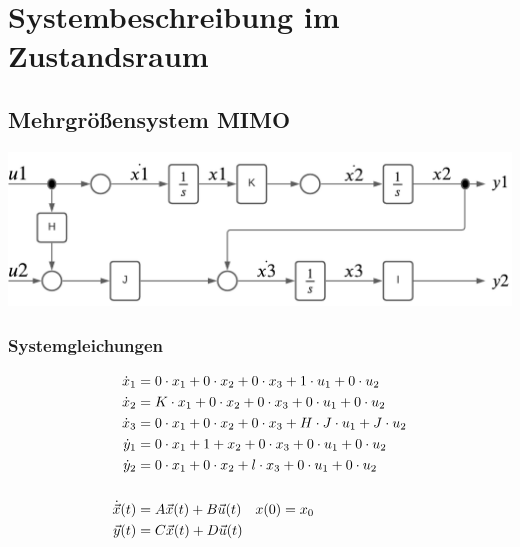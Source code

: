 \newpage
\section{Systembeschreibung im Zustandsraum}
\subsection{Mehrgrößensystem MIMO}


\begin{center}
	\includegraphics[width=1\columnwidth]{Figures/Signalflussplan.png}
\end{center}

\subsubsection{Systemgleichungen}
\vspace{-1em}
\begin{align*}
	\dot{x}_{1} & = 0\cdot x_{1} +0\cdot x_{2} +0\cdot x_{3} +1\cdot u_{1}+0\cdot u_{2}        \\
	\dot{x}_{2} & = K\cdot x_{1} +0\cdot x_{2} +0\cdot x_{3} +0\cdot u_{1}+0\cdot u_{2}        \\
	\dot{x}_{3} & = 0\cdot x_{1} +0\cdot x_{2} +0\cdot x_{3} +H\cdot J\cdot u_{1}+J\cdot u_{2} \\
	\dot{y}_{1} & = 0\cdot x_{1} +1+x_{2} +0\cdot x_{3} +0\cdot u_{1}+0\cdot u_{2}             \\
	\dot{y}_{2} & = 0\cdot x_{1} +0\cdot x_{2} +l\cdot x_{3} +0\cdot u_{1}+0\cdot u_{2}        \\
	\vspace*{1em} \\
	\dot{\Vec{x}}(t) & = A\vec{x}(t) + B\vec{u}(t) \quad x(0) = x_{0} \\
	\vec{y}(t)       & = C\vec{x}(t) + D\vec{u}(t)
\end{align*}

